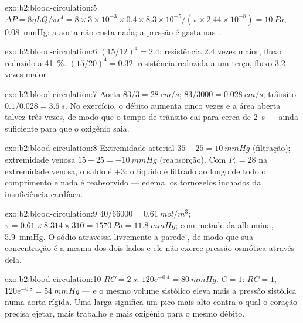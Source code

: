 \begin{solution}{exo:b2:blood-circulation:5}
$\Delta P = 8\eta LQ/\pi r^{4} = 8\times 3\times 10^{-3}\times
0.4\times 8.3\times 10^{-5}/(\pi\times 2.44\times 10^{-8}) =
\qty{10}{Pa}$, \qty{0.08}{mmHg}: a aorta não custa nada; a pressão é
gasta nas .
\end{solution}

\begin{solution}{exo:b2:blood-circulation:6}
$(15/12)^{4} = 2.4$: resistência 2.4 vezes maior, fluxo reduzido a
\qty{41}{\%}. $(15/20)^{4} = 0.32$: resistência reduzida a um terço,
fluxo 3.2 vezes maior.
\end{solution}

\begin{solution}{exo:b2:blood-circulation:7}
Aorta $83/3 = \qty{28}{cm/s}$;  $83/3000 =
\qty{0.028}{cm/s}$; trânsito $0.1/0.028 = \qty{3.6}{s}$. No exercício,
o débito aumenta cinco vezes e a área  aberta talvez três vezes,
de modo que o tempo de trânsito cai para cerca de \qty{2}{s} --- ainda
suficiente para que o oxigênio saia.
\end{solution}

\begin{solution}{exo:b2:blood-circulation:8}
Extremidade arterial $35 - 25 = \qty{+10}{mmHg}$ (filtração);
extremidade venosa $15
- 25 = \qty{-10}{mmHg}$ (reabsorção). Com $P_c = 28$ na extremidade
venosa, o saldo é $+3$: o líquido é filtrado ao longo de todo o
comprimento e nada é reabsorvido --- edema, os tornozelos inchados da
insuficiência cardíaca.
\end{solution}

\begin{solution}{exo:b2:blood-circulation:9}
$40/66000 = \qty{0.61}{mol/m^3}$; $\pi = 0.61\times 8.314\times 310 =
\qty{1570}{Pa} = \qty{11.8}{mmHg}$; com metade da albumina,
\qty{5.9}{mmHg}. O sódio atravessa livremente a parede , de modo
que sua concentração é a mesma dos dois lados e ele não exerce pressão
osmótica através dela.
\end{solution}

\begin{solution}{exo:b2:blood-circulation:10}
$RC = \qty{2}{s}$: $120e^{-0.4} = \qty{80}{mmHg}$. $C = 1$: $RC = 1$,
$120e^{-0.8} = \qty{54}{mmHg}$ --- e o mesmo volume sistólico eleva mais
a pressão sistólica numa aorta rígida. Uma  larga
significa um pico mais alto contra o qual o coração precisa ejetar,
mais trabalho e mais oxigênio para o mesmo débito.
\end{solution}

